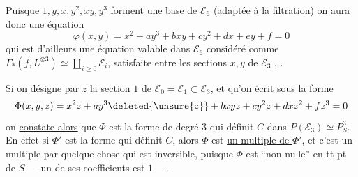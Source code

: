 
 Puisque $1,y,x,y^2,xy,y^3$ forment une base de $\mathcal E_6$ (adaptée à la filtration) on aura donc une équation
\[
\varphi(x,y)=\boxed{x^2+ay^3+bxy+cy^2+dx+ey+f=0}
\]
qui est d'ailleurs une équation valable dans $\mathcal E_6$ considéré comme  $\Gamma_*(f,\underline L^{\otimes3})\simeq\coprod_{i\geq0}\mathcal E_i$, satisfaite entre les sections $x,y$ de $\mathcal E_3$ , .

 Si on désigne par $z$ la section $1$ de $\mathcal E_0=\mathcal E_1\subset \mathcal E_3$, et qu'on  écrit  sous la forme
\[
\Phi(x,y,z)=x^2z+ay^3\deleted{\unsure{z}}+bxyz+cy^2z+dxz^2+fz^3=0
\]
on \uline{constate alors} que $\Phi$ est la forme de degré $3$ qui définit  $C$ dans $P(\mathcal E_3)\simeq P_S^3$. En effet si $\Phi'$ est la forme qui définit $C$, alors $\Phi$ est \uline{un multiple de $\Phi'$}, et  c'est un multiple par quelque chose qui est inversible, puisque $\Phi$ est ``non nulle'' en tt pt de $S$ --- un de ses coefficients est $1$ ---.
